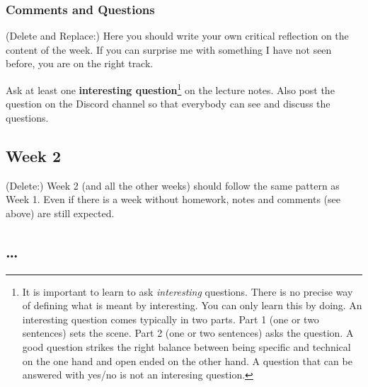 \documentclass{article}
\theoremstyle{theorem}
\theoremstyle{definition}
\theoremstyle{remark}
\begin{document}
  \egroup

%
%

\subsubsection*{Comments and Questions}

(Delete and Replace:) Here you should write your own critical reflection on the content of the week. If you can surprise me with something I have not seen before, you are on the right track.


Ask at least one \textbf{interesting question}\footnote{It is important to learn to ask \emph{interesting} questions. There is no precise way of defining what is meant by interesting. You can only learn this by doing. An interesting question comes typically in two parts. Part 1 (one or two sentences) sets the scene. Part 2 (one or two sentences) asks the question. A good question strikes the right balance between being specific and technical on the one hand and open ended on the other hand. A question that can be answered with yes/no is not an interesing question.} on the lecture notes. Also post the question on the Discord channel so that everybody can see and discuss the questions.

\subsection{Week 2}

(Delete:) Week 2 (and all the other weeks) should follow the same pattern as Week 1. Even if there is a week without homework, notes and comments (see above) are still expected.

\subsection{\ldots}
\end{document}
